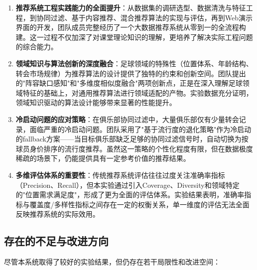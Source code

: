 \documentclass[a4paper]{article}
\begin{document}
\begin{enumerate}
    \item \textbf{推荐系统工程实践能力的全面提升}：从数据集的调研选型、数据清洗与特征工程，到协同过滤、基于内容推荐、混合推荐算法的实现与评估，再到Web演示界面的开发，团队成员完整经历了一个大数据推荐系统从零到一的全流程构建。这一过程不仅加深了对课堂理论知识的理解，更培养了解决实际工程问题的综合能力。
    
    \item \textbf{领域知识与算法创新的深度融合}：足球领域的特殊性（位置体系、年龄结构、转会市场规律）为推荐算法的设计提供了独特的约束和创新空间。团队提出的"阵容缺口感知"和"多维度相似度融合"两项创新点，正是在深入理解足球领域特征的基础上，对通用推荐算法进行领域适配的产物。实验数据充分证明，领域知识驱动的算法设计能够带来显著的性能提升。
    
    \item \textbf{冷启动问题的应对策略}：在俱乐部协同过滤中，大量俱乐部仅有少量转会记录，面临严重的冷启动问题。团队采用了"基于流行度的退化策略"作为冷启动的fallback方案——当目标俱乐部缺乏足够的协同过滤信号时，自动切换为按球员身价排序的流行度推荐。虽然这一策略的个性化程度有限，但在数据极度稀疏的场景下，仍能提供具有一定参考价值的推荐结果。
    
    \item \textbf{多维评估体系的重要性}：传统推荐系统评估往往过度关注准确率指标（Precision、Recall），但本实验通过引入Coverage、Diversity和领域特定的"位置需求满足度"，形成了更为全面的评估体系。实验结果表明，准确率指标与覆盖度/多样性指标之间存在一定的权衡关系，单一维度的评估无法全面反映推荐系统的实际效用。
\end{enumerate}

\subsection{存在的不足与改进方向}

尽管本系统取得了较好的实验结果，但仍存在若干局限性和改进空间：
\end{document}
